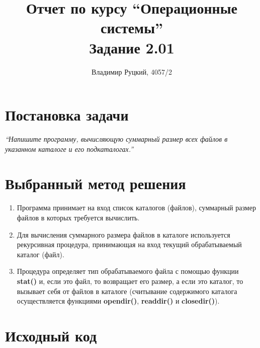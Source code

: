 \documentclass[a4paper,12pt]{article}
\title{Отчет по курсу ``Операционные системы'' \\ Задание 2.01}
\author{Владимир Руцкий, 4057/2}
\newcommand{\commandquote}[1]{\textbf{#1}}
\begin{document}
\maketitle

\section*{Постановка задачи}
\textit{``Напишите программу, вычисляющую суммарный размер всех файлов в указанном
каталоге и его подкаталогах.''}

\section*{Выбранный метод решения}
\begin{enumerate}
 \item Программа принимает на вход список каталогов (файлов),
суммарный размер файлов в которых требуется вычислить.
 \item Для вычисления суммарного размера файлов в каталоге используется рекурсивная процедура,
принимающая на вход текущий обрабатываемый каталог (файл).
 \item Процедура определяет тип обрабатываемого файла с помощью функции \commandquote{stat()} и, 
если это файл, то возвращает его размер,
а если это каталог, то вызывает себя от файлов в каталоге 
(считывание содержимого каталога осуществляется функциями \commandquote{opendir()}, 
\commandquote{readdir()} и \commandquote{closedir()}).
\end{enumerate}

\pagebreak
\section*{Исходный код}
\lstset{language=bash, caption=task\_2\_01.c,%
label=source-code, basicstyle=\footnotesize,%
numbers=left, numberstyle=\footnotesize, numbersep=5pt, frame=single, breaklines=true, breakatwhitespace=false,%
inputencoding=utf8x}

\end{document}
